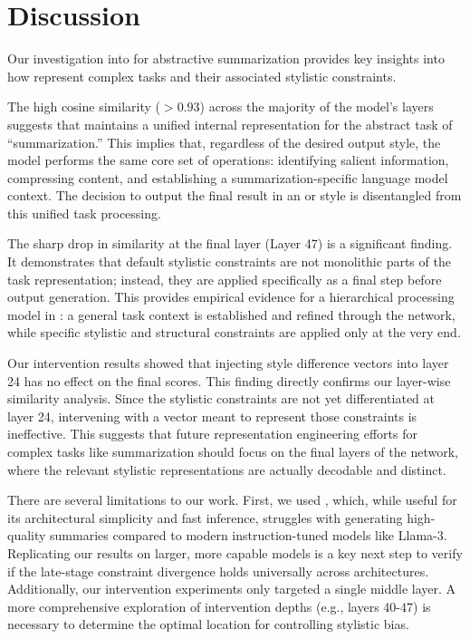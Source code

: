 \section{Discussion}
\label{sec:discussion}

Our investigation into \fvs for abstractive summarization provides key insights into how \fvsabbr represent complex tasks and their associated stylistic constraints.

The high cosine similarity ($> 0.93$) across the majority of the model's layers suggests that \gpttwo maintains a unified internal representation for the abstract task of ``summarization.'' This implies that, regardless of the desired output style, the model performs the same core set of operations: identifying salient information, compressing content, and establishing a summarization-specific language model context. The decision to output the final result in an \extractive or \abstractive style is disentangled from this unified task processing.

The sharp drop in similarity at the final layer (Layer 47) is a significant finding. It demonstrates that default stylistic constraints are not monolithic parts of the task representation; instead, they are applied specifically as a final step before output generation. This provides empirical evidence for a hierarchical processing model in \fvsabbr: a general task context is established and refined through the network, while specific stylistic and structural constraints are applied only at the very end.

Our intervention results showed that injecting style difference vectors into layer 24 has no effect on the final \rouge scores. This finding directly confirms our layer-wise similarity analysis. Since the stylistic constraints are not yet differentiated at layer 24, intervening with a vector meant to represent those constraints is ineffective. This suggests that future representation engineering efforts for complex tasks like summarization should focus on the final layers of the network, where the relevant stylistic representations are actually decodable and distinct.

There are several limitations to our work. First, we used \gpttwo, which, while useful for its architectural simplicity and fast inference, struggles with generating high-quality summaries compared to modern instruction-tuned models like Llama-3. Replicating our results on larger, more capable models is a key next step to verify if the late-stage constraint divergence holds universally across architectures. Additionally, our intervention experiments only targeted a single middle layer. A more comprehensive exploration of intervention depths (e.g., layers 40-47) is necessary to determine the optimal location for controlling stylistic bias.


